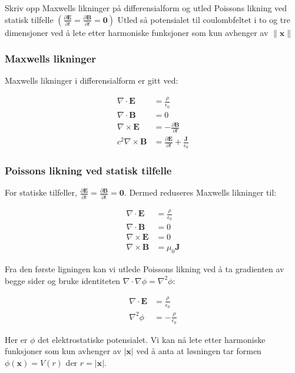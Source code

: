 \homeworkProblem[2]

Skriv opp Maxwells likninger på differensialform og utled Poissons likning ved statisk tilfelle $ \left(\frac{\partial \mathbf{E}}{\partial t}=\frac{\partial \mathbf{B}}{\partial t}=\mathbf{0}\right)$ Utled så potensialet til coulombfeltet i to og tre dimensjoner ved å lete etter harmoniske funksjoner som kun avhenger av $\|\mathbf{x}\|$

\subsubsection*{Maxwells likninger}
Maxwells likninger i differensialform er gitt ved:

\begin{align*}
\nabla \cdot \mathbf{E} &= \frac{\rho}{\epsilon_0} \\
\nabla \cdot \mathbf{B} &= 0 \\
\nabla \times \mathbf{E} &= -\frac{\partial \mathbf{B}}{\partial t} \\
c^{2} \nabla \times \mathbf{B} &=\frac{\partial \mathbf{E}}{\partial t}+\frac{\mathbf{J}}{\epsilon_{0}}
\end{align*}

\subsubsection*{Poissons likning ved statisk tilfelle}
For statiske tilfeller, $\frac{\partial \mathbf{E}}{\partial t}=\frac{\partial \mathbf{B}}{\partial t}=\mathbf{0}$. Dermed reduseres Maxwells likninger til:

\begin{align*}
\nabla \cdot \mathbf{E} &= \frac{\rho}{\epsilon_0} \\
\nabla \cdot \mathbf{B} &= 0 \\
\nabla \times \mathbf{E} &= 0 \\
\nabla \times \mathbf{B} &= \mu_0 \mathbf{J}
\end{align*}

Fra den første ligningen kan vi utlede Poissons likning ved å ta gradienten av begge sider og bruke identiteten $\nabla \cdot \nabla \phi = \nabla^2 \phi$:

\begin{align*}
\nabla \cdot \mathbf{E} &= \frac{\rho}{\epsilon_0} \\
\nabla^2 \phi &= -\frac{\rho}{\epsilon_0}
\end{align*}

Her er $\phi$ det elektrostatiske potensialet. Vi kan nå lete etter harmoniske funksjoner som kun avhenger av $|\mathbf{x}|$ ved å anta at løsningen tar formen $\phi(\mathbf{x}) = V(r)$ der $r=|\mathbf{x}|$.

